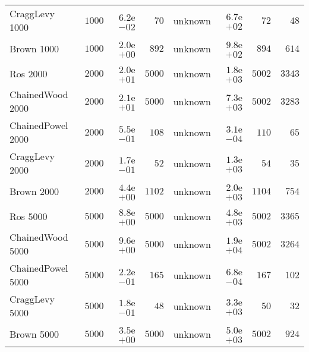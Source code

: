 \begin{longtable}[c]{lrrrrrrr}
CraggLevy 1000 & \( 1000\) & \( 6.2\)e\(-02\) & \(   70\) & unknown & \( 6.7\)e\(+02\) & \(   72\) & \(   48\) \\
Brown 1000 & \( 1000\) & \( 2.0\)e\(+00\) & \(  892\) & unknown & \( 9.8\)e\(+02\) & \(  894\) & \(  614\) \\
Ros 2000 & \( 2000\) & \( 2.0\)e\(+01\) & \( 5000\) & unknown & \( 1.8\)e\(+03\) & \( 5002\) & \( 3343\) \\
ChainedWood 2000 & \( 2000\) & \( 2.1\)e\(+01\) & \( 5000\) & unknown & \( 7.3\)e\(+03\) & \( 5002\) & \( 3283\) \\
ChainedPowel 2000 & \( 2000\) & \( 5.5\)e\(-01\) & \(  108\) & unknown & \( 3.1\)e\(-04\) & \(  110\) & \(   65\) \\
CraggLevy 2000 & \( 2000\) & \( 1.7\)e\(-01\) & \(   52\) & unknown & \( 1.3\)e\(+03\) & \(   54\) & \(   35\) \\
Brown 2000 & \( 2000\) & \( 4.4\)e\(+00\) & \( 1102\) & unknown & \( 2.0\)e\(+03\) & \( 1104\) & \(  754\) \\
Ros 5000 & \( 5000\) & \( 8.8\)e\(+00\) & \( 5000\) & unknown & \( 4.8\)e\(+03\) & \( 5002\) & \( 3365\) \\
ChainedWood 5000 & \( 5000\) & \( 9.6\)e\(+00\) & \( 5000\) & unknown & \( 1.9\)e\(+04\) & \( 5002\) & \( 3264\) \\
ChainedPowel 5000 & \( 5000\) & \( 2.2\)e\(-01\) & \(  165\) & unknown & \( 6.8\)e\(-04\) & \(  167\) & \(  102\) \\
CraggLevy 5000 & \( 5000\) & \( 1.8\)e\(-01\) & \(   48\) & unknown & \( 3.3\)e\(+03\) & \(   50\) & \(   32\) \\
Brown 5000 & \( 5000\) & \( 3.5\)e\(+00\) & \( 5000\) & unknown & \( 5.0\)e\(+03\) & \( 5002\) & \(  924\) \\
\hline 
\end{longtable}

